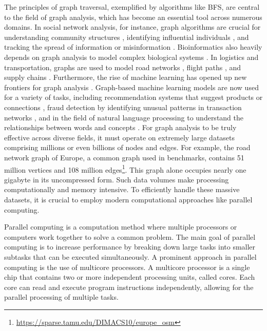 The principles of graph traversal, exemplified by algorithms like BFS, are central to the field of graph analysis, which has become an essential tool across numerous domains. In social network analysis, for instance, graph algorithms are crucial for understanding community structures \cite{newman2013community}, identifying influential individuals \cite{li2018influence}, and tracking the spread of information \cite{wang2011understanding} or misinformation \cite{cui2020deterrent}. Bioinformatics also heavily depends on graph analysis to model complex biological systems \cite{yi2022graph}. In logistics and transportation, graphs are used to model road networks \cite{thomson1995graph}, flight paths \cite{ozdemir2001flight}, and supply chains \cite{wagner2010assessing}. Furthermore, the rise of machine learning has opened up new frontiers for graph analysis \cite{chami2022machine}. Graph-based machine learning models are now used for a variety of tasks, including recommendation systems that suggest products or connections \cite{gao2023survey}, fraud detection by identifying unusual patterns in transaction networks \cite{pourhabibi2020fraud}, and in the field of natural language processing to understand the relationships between words and concepts \cite{wu2023graph}. For graph analysis to be truly effective across diverse fields, it must operate on extremely large datasets comprising millions or even billions of nodes and edges. For example, the road network graph of Europe, a common graph used in benchmarks, contains 51 million vertices and 108 million edges\footnote{\url{https://sparse.tamu.edu/DIMACS10/europe_osm}}. This graph alone occupies nearly one gigabyte in its uncompressed form. Such data volumes make processing computationally and memory intensive. To efficiently handle these massive datasets, it is crucial to employ modern computational approaches like parallel computing.

Parallel computing is a computation method where multiple processors or computers work together to solve a common problem. The main goal of parallel computing is to increase performance by breaking down large tasks into smaller subtasks that can be executed simultaneously. A prominent approach in parallel computing is the use of multicore processors. A multicore processor is a single chip that contains two or more independent processing units, called cores. Each core can read and execute program instructions independently, allowing for the parallel processing of multiple tasks.

